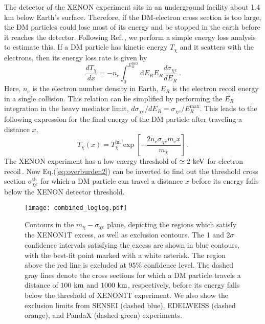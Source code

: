 \documentclass[prd,aps,twocolumn,tightenlines,notitlepage,nofootinbib,preprintnumbers,letterpaper,superscriptaddress]{revtex4-2}
\newcommand{\km}{{\rm\ km}}
\newcommand{\keV}{{\rm\ keV}}
\newcommand{\mchi}{m_\chi}
\newcommand{\sce}{\sigma_{\chi e}}
\newcommand{\nel}{n_\mathrm{e}}
\newcommand{\mel}{m_\mathrm{e}}
\newcommand{\dd}{\text{d}}
\begin{document}
The detector of the XENON experiment sits in an underground facility about 1.4 km below Earth's surface. Therefore, if the DM-electron cross section is too large, the DM particles could lose most of its energy and be stopped in the earth before it reaches the detector. Following Ref.\,\cite{PhysRevD.41.3594}, we perform a simple energy loss analysis to estimate this. If a DM particle has kinetic energy $T_\chi$ and it scatters with the electrons, then its energy loss rate is given by
\begin{equation}\label{eq:overburden1}
    \dfrac{dT_\chi}{dx} = -\nel \int_0^{E_R^\mathrm{max}} \dd E_R E_R \dfrac{d\sce}{dE_R}\,.
\end{equation}
Here, $\nel$ is the electron number density in Earth, $E_R$ is the electron recoil energy in a single collision. This relation can be simplified by performing the $E_R$ integration in the heavy mediator limit, $d\sce/dE_R=\sce/E_R^\mathrm{max}$. This leads to the following expression for the final energy of the DM particle after traveling a distance $x$,
\begin{equation}\label{eq:overburden2}
    T_\chi(x) = T_\chi^\text{ini}\exp\left[-\dfrac{2\nel\sce \mel x}{\mchi}\right]\,.
\end{equation}
The XENON experiment has a low energy threshold of $\simeq 2\keV$ for electron recoil\,\cite{Aprile:2019dme}. Now Eq.(\ref{eq:overburden2}) can be inverted to find out the threshold cross section $\sce^\text{th}$ for which a DM particle can travel a distance $x$ before its energy falls below the XENON detector threshold.
%
%
\begin{figure}[t]
    \centering
    \texttt{[image: combined\_loglog.pdf]}
    \caption{Contours in the $\mchi-\sce$ plane, depicting the regions which satisfy the XENON1T excess, as well as exclusion contours. The 1 and $2\sigma$ confidence intervals satisfying the excess are shown in blue contours, with the best-fit point marked with a white asterisk. The region above the red line is excluded at $95\%$ confidence level. The dashed gray lines denote the cross sections for which a DM particle travels a distance of $100\km$ and $1000\km$, respectively, before its energy falls below the threshold of XENON1T experiment. We also show the exclusion limits from SENSEI (dashed blue), EDELWEISS (dashed orange), and PandaX (dashed green) experiments.}
    \label{fig:contour}
\end{figure}
\end{document}
